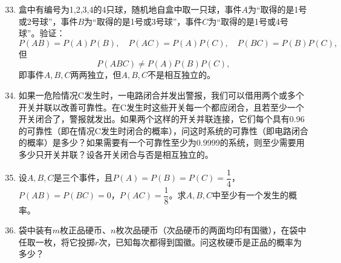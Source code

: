 \documentclass[UTF8]{ctexart}
\begin{document}
\begin{enumerate}
\setcounter{enumi}{32}
\item 盒中有编号为1,2,3,4的4只球，随机地自盒中取一只球，事件$A$为``取得的是1号或2号球''，事件$B$为``取得的是1号或3号球''，事件$C$为``取得的是1号或4号球''。验证：
\[
P(AB)=P(A)P(B),\quad P(AC)=P(A)P(C),\quad P(BC)=P(B)P(C),
\]
但
\[
P(ABC)\ne P(A)P(B)P(C),
\]
即事件$A,B,C$两两独立，但$A,B,C$不是相互独立的。

\item 如果一危险情况C发生时，一电路闭合并发出警报，我们可以借用两个或多个开关并联以改善可靠性。在C发生时这些开关每一个都应闭合，且若至少一个开关闭合了，警报就发出。如果两个这样的开关并联连接，它们每个具有0.96的可靠性（即在情况C发生时闭合的概率），问这时系统的可靠性（即电路闭合的概率）是多少？如果需要有一个可靠性至少为0.9999的系统，则至少需要用多少只开关并联？设各开关闭合与否是相互独立的。

\setcounter{enumi}{34}
\item 设$A,B,C$是三个事件，且$P(A)=P(B)=P(C)=\dfrac{1}{4}$，$P(AB)=P(BC)=0$，$P(AC)=\dfrac{1}{8}$。求$A,B,C$中至少有一个发生的概率。

\setcounter{enumi}{37}
\item 袋中装有$m$枚正品硬币、$n$枚次品硬币（次品硬币的两面均印有国徽），在袋中任取一枚，将它投掷$r$次，已知每次都得到国徽。问这枚硬币是正品的概率为多少？
\end{enumerate}
\end{document}

